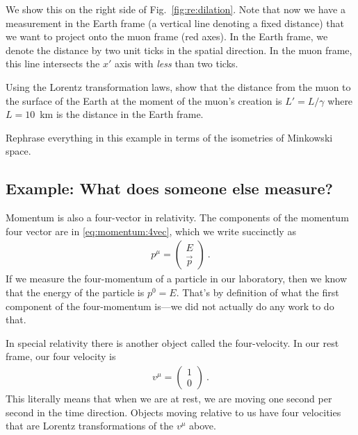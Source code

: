 \documentclass[12pt]{article}
\begin{document}
We show this on the right side of Fig.~\ref{fig:re:dilation}. Note that now we have a measurement in the Earth frame (a vertical line denoting a fixed distance) that we want to project onto the muon frame (red axes). In the Earth frame, we denote the distance by two unit ticks in the spatial direction. In the muon frame, this line intersects the $x'$ axis with \emph{less} than two ticks.

\begin{exercise}
Using the Lorentz transformation laws, show that the distance from the muon to the surface of the Earth at the moment of the muon's creation is $L'=L/\gamma$ where $L=10$~km is the distance in the Earth frame. 
\end{exercise}

\begin{exercise}
Rephrase everything in this example in terms of the isometries of Minkowski space. 
\end{exercise}

\subsection{Example: What does someone else measure?}
\label{sec:relativity:alien}

Momentum is also a four-vector in relativity. The components of the momentum four vector are in \eqref{eq:momentum:4vec}, which we write succinctly as
\begin{align}
    p^\mu = 
    \begin{pmatrix}
        E \\ \vec{p}
    \end{pmatrix} \ .
\end{align}
If we measure the four-momentum of a particle in our laboratory, then we know that the energy of the particle is $p^0 = E$. That's by definition of what the first component of the four-momentum is---we did not actually do any work to do that. 

In special relativity there is another object called the four-velocity. In our rest frame, our four velocity is
\begin{align}
    v^\mu = \begin{pmatrix}
        1\\ 0
    \end{pmatrix} \ .
    \label{eq:4:velocity:in:rest:Frame}
\end{align}
This literally means that when we are at rest, we are moving one second per second in the time direction. Objects moving relative to us have four velocities that are Lorentz transformations of the $v^\mu$ above. 
\end{document}
